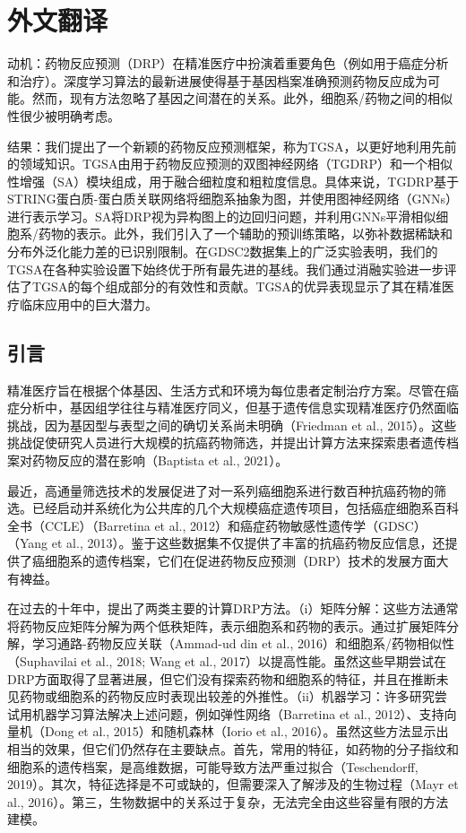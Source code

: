 \cleardoublepage

\newrefsection

\chapter{外文翻译}


动机：药物反应预测（DRP）在精准医疗中扮演着重要角色（例如用于癌症分析和治疗）。深度学习算法的最新进展使得基于基因档案准确预测药物反应成为可能。然而，现有方法忽略了基因之间潜在的关系。此外，细胞系/药物之间的相似性很少被明确考虑。

结果：我们提出了一个新颖的药物反应预测框架，称为TGSA，以更好地利用先前的领域知识。TGSA由用于药物反应预测的双图神经网络（TGDRP）和一个相似性增强（SA）模块组成，用于融合细粒度和粗粒度信息。具体来说，TGDRP基于STRING蛋白质-蛋白质关联网络将细胞系抽象为图，并使用图神经网络（GNNs）进行表示学习。SA将DRP视为异构图上的边回归问题，并利用GNNs平滑相似细胞系/药物的表示。此外，我们引入了一个辅助的预训练策略，以弥补数据稀缺和分布外泛化能力差的已识别限制。在GDSC2数据集上的广泛实验表明，我们的TGSA在各种实验设置下始终优于所有最先进的基线。我们通过消融实验进一步评估了TGSA的每个组成部分的有效性和贡献。TGSA的优异表现显示了其在精准医疗临床应用中的巨大潜力。

\section{引言}
精准医疗旨在根据个体基因、生活方式和环境为每位患者定制治疗方案\cite{Hodson2016}。尽管在癌症分析中，基因组学往往与精准医疗同义，但基于遗传信息实现精准医疗仍然面临挑战，因为基因型与表型之间的确切关系尚未明确（Friedman et al., 2015）。这些挑战促使研究人员进行大规模的抗癌药物筛选，并提出计算方法来探索患者遗传档案对药物反应的潜在影响（Baptista et al., 2021）。

最近，高通量筛选技术的发展促进了对一系列癌细胞系进行数百种抗癌药物的筛选。已经启动并系统化为公共库的几个大规模癌症遗传项目，包括癌症细胞系百科全书（CCLE）（Barretina et al., 2012）和癌症药物敏感性遗传学（GDSC）（Yang et al., 2013）。鉴于这些数据集不仅提供了丰富的抗癌药物反应信息，还提供了癌细胞系的遗传档案，它们在促进药物反应预测（DRP）技术的发展方面大有裨益。

在过去的十年中，提出了两类主要的计算DRP方法。（i）矩阵分解：这些方法通常将药物反应矩阵分解为两个低秩矩阵，表示细胞系和药物的表示。通过扩展矩阵分解，学习通路-药物反应关联（Ammad-ud din et al., 2016）和细胞系/药物相似性（Suphavilai et al., 2018; Wang et al., 2017）以提高性能。虽然这些早期尝试在DRP方面取得了显著进展，但它们没有探索药物和细胞系的特征，并且在推断未见药物或细胞系的药物反应时表现出较差的外推性。（ii）机器学习：许多研究尝试用机器学习算法解决上述问题，例如弹性网络（Barretina et al., 2012）、支持向量机（Dong et al., 2015）和随机森林（Iorio et al., 2016）。虽然这些方法显示出相当的效果，但它们仍然存在主要缺点。首先，常用的特征，如药物的分子指纹和细胞系的遗传档案，是高维数据，可能导致方法严重过拟合（Teschendorff, 2019）。其次，特征选择是不可或缺的，但需要深入了解涉及的生物过程（Mayr et al., 2016）。第三，生物数据中的关系过于复杂，无法完全由这些容量有限的方法建模。

